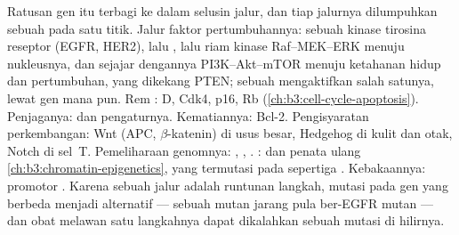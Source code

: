\begin{proposition}\label{prop:b3:cancer-biology:pathways}
Ratusan gen  itu terbagi ke dalam selusin jalur, dan tiap jalurnya
dilumpuhkan sebuah  pada satu titik. Jalur faktor pertumbuhannya: sebuah
kinase tirosina reseptor (EGFR, HER2), lalu , lalu riam kinase
Raf--MEK--ERK menuju nukleusnya, dan sejajar dengannya PI3K--Akt--mTOR menuju ketahanan hidup dan
pertumbuhan, yang dikekang PTEN; sebuah  mengaktifkan salah satunya, lewat
gen mana pun. Rem :  D, Cdk4, p16, Rb (\cref{ch:b3:cell-cycle-apoptosis}).
Penjaganya:  dan pengaturnya. Kematiannya: Bcl-2. Pengisyaratan
perkembangan: Wnt (APC, $\beta$-katenin) di usus besar, Hedgehog di kulit
dan otak, Notch di sel~T. Pemeliharaan genomnya: ,
, . :  dan penata ulang
\cref{ch:b3:chromatin-epigenetics}, yang termutasi pada sepertiga .
Kebakaannya: promotor . Karena sebuah jalur adalah runtunan
langkah, mutasi pada gen yang berbeda menjadi alternatif --- sebuah 
 mutan jarang pula ber-EGFR mutan --- dan obat melawan satu langkahnya
dapat dikalahkan sebuah mutasi di hilirnya.
\end{proposition}

